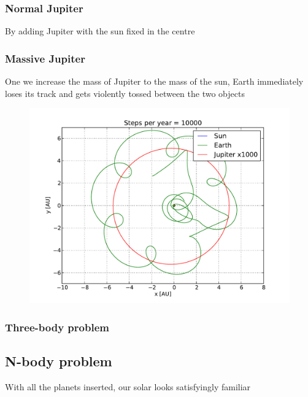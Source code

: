 \documentclass[10pt]{article}
\begin{document}
\begin{multicols}{2}
\subsubsection{Normal Jupiter}
By adding Jupiter with the sun fixed in the centre 
\subsubsection{Massive Jupiter}
One we increase the mass of Jupiter to the mass of the sun, Earth
immediately loses its track and gets violently tossed between the two
objects
\begin{figure}[H]
    \centering
    \includegraphics[width=1.0\linewidth]{../results/EJSx1000_1.pdf}
    \label{fig:name}
    \caption{}
\end{figure}

\subsubsection{Three-body problem}


\subsection{N-body problem}
With all the planets inserted, our solar looks satisfyingly familiar


\end{multicols}
\end{document}
